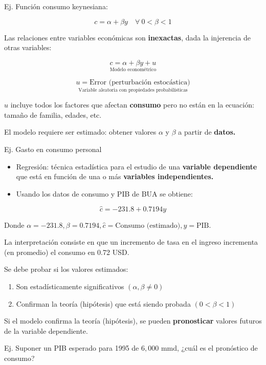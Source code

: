 \documentclass[
]{book}
\providecommand{\tightlist}{%
  \setlength{\itemsep}{0pt}\setlength{\parskip}{0pt}}
\begin{document}
Ej. Función consumo keynesiana:

\[
c = \alpha + \beta y \quad \forall \ 0< \beta <1
\]

Las relaciones entre variables económicas son \textbf{inexactas}, dada la injerencia de otras variables:

\[ 
\underset{\text{Modelo econométrico} }{c = \alpha + \beta y + u}
\]

\[ 
\underset{ \text{Variable aleatoria con propiedades probabilísticas} }{ u = \text{Error (perturbación estocástica)} } 
\]

\(u\) incluye todos los factores que afectan \textbf{consumo} pero no están en la ecuación: tamaño de familia, edades, etc.

El modelo requiere ser estimado: obtener valores \(\alpha\) y \(\beta\) a partir de \textbf{datos.}

Ej. Gasto en consumo personal

\begin{itemize}
\tightlist
\item
  Regresión: técnica estadística para el estudio de una \textbf{variable dependiente} que está en función de una o más \textbf{variables independientes.}
\item
  Usando los datos de consumo y PIB de BUA se obtiene:
\end{itemize}

\[ 
\hat c = -231.8 + 0.7194 y
\]

Donde \(\alpha = -231.8, \beta = 0.7194, \hat c = \text{Consumo (estimado)}, y = \text{PIB}\).

La interpretación consiste en que un incremento de tasa en el ingreso incrementa (en promedio) el consumo en 0.72 USD.

Se debe probar si los valores estimados:

\begin{enumerate}
\def\labelenumi{\arabic{enumi}.}
\tightlist
\item
  Son estadísticamente significativos \((\alpha, \beta \neq 0)\)\\
\item
  Confirman la teoría (hipótesis) que está siendo probada \((0<\beta<1)\)
\end{enumerate}

Si el modelo confirma la teoría (hipótesis), se pueden \textbf{pronosticar} valores futuros de la variable dependiente.

Ej. Suponer un PIB esperado para 1995 de \(6,000\) mmd, ¿cuál es el pronóstico de consumo?
\end{document}
